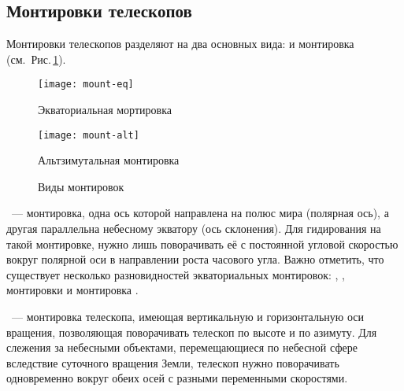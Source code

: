 \subsection{Монтировки телескопов}
Монтировки телескопов разделяют на два основных вида:  и  монтировка (см.~Рис.\,\ref{mounts}).
\begin{figure}[h]
    \centering
    \hspace*{.4cm}
    \begin{subcaptionblock}{0.48\textwidth}
        \texttt{[image: mount-eq]}
        \caption{Экваториальная мортировка}
    \end{subcaptionblock}
    \hspace*{.4cm}
    \begin{subcaptionblock}{0.41\textwidth}
        \texttt{[image: mount-alt]}
        \caption{Альтзимутальная монтировка}
    \end{subcaptionblock}
    \hspace*{.4cm}
    \caption{Виды монтировок}
    \label{mounts}
\end{figure}

~--- монтировка, одна ось которой направлена на полюс мира (полярная ось), а другая параллельна небесному экватору (ось склонения).
Для гидирования на такой монтировке, нужно лишь поворачивать её с постоянной угловой скоростью вокруг полярной оси в направлении роста часового угла.
Важно отметить, что существует несколько разновидностей экваториальных монтировок: , ,  монтировки и монтировка .

~--- монтировка телескопа, имеющая вертикальную и горизонтальную оси вращения, позволяющая поворачивать телескоп по высоте и по азимуту. Для слежения за небесными объектами, перемещающиеся по небесной сфере вследствие суточного вращения Земли, телескоп нужно поворачивать одновременно вокруг обеих осей с разными переменными скоростями.

